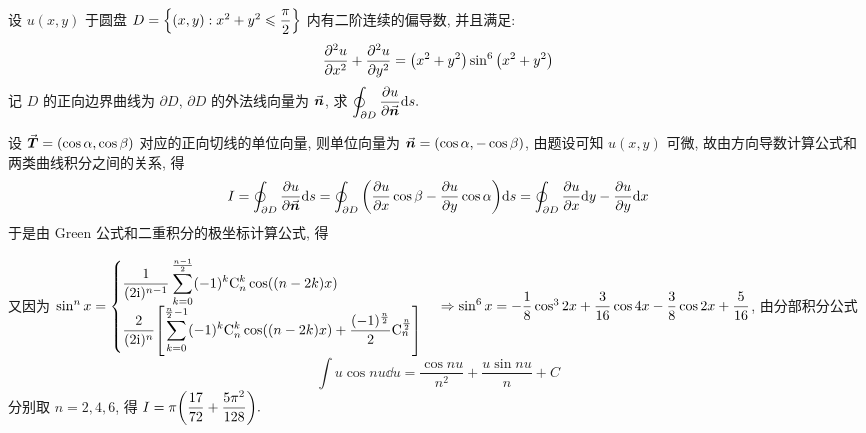 
\begin{example}
    设 $u(x,y)$ 于圆盘 $D=\qty{(x,y):x^2+y^2\leqslant \dfrac{\pi}{2}}$ 内有二阶连续的偏导数, 并且满足:
    $$\pdv[2]{u}{x}+\pdv[2]{u}{y}=\qty(x^2+y^2)\sin^6\qty(x^2+y^2)$$
    记 $D$ 的正向边界曲线为 $\partial D$, $\partial D$ 的外法线向量为 $\va*{n}$, 求 $\displaystyle \oint_{\partial D}\pdv{u}{\va*{n}}\dd s.$
\end{example}
\begin{solution}
    设 $\va*{T}=(\cos\alpha,\cos\beta)$ 对应的正向切线的单位向量, 则单位向量为 $\va*{n}=(\cos\alpha,-\cos\beta)$, 由题设可知 $u(x,y)$ 可微,
    故由方向导数计算公式和两类曲线积分之间的关系, 得
    $$I=\oint_{\partial D}\pdv{u}{\va*{n}}\dd s=\oint_{\partial D}\qty(\pdv{u}{x}\cos \beta-\pdv{u}{y}\cos \alpha)\dd s=\oint_{\partial D}\pdv{u}{x}\dd y-\pdv{u}{y}\dd x$$
    于是由 Green 公式和二重积分的极坐标计算公式, 得
    又因为 $\sin^nx=\begin{cases}
            \displaystyle \dfrac{1}{(2\mathrm{i})^{n-1}}\sum_{k=0}^{\frac{n-1}{2}}(-1)^k\mathrm{C}_n^k\cos((n-2k)x) \\
            \displaystyle \dfrac{2}{(2\mathrm{i})^n}\qty[\sum_{k=0}^{\frac{n}{2}-1}(-1)^k\mathrm{C}_n^k\cos((n-2k)x)+\dfrac{(-1)^{\frac{n}{2}}}{2}\mathrm{C}_n^{\frac{n}{2}}]
        \end{cases}\Rightarrow \sin^6x=-\dfrac{1}{8}\cos^32x+\dfrac{3}{16}\cos 4x-\dfrac{3}{8}\cos 2x+\dfrac{5}{16}$, 由分部积分公式
    $$\int u\cos nu\dd u=\dfrac{\cos nu}{n^2}+\dfrac{u\sin nu}{n}+C$$
    分别取 $n=2,4,6$, 得 $\displaystyle I=\pi\qty(\dfrac{17}{72}+\dfrac{5\pi^2}{128}).$
\end{solution}

